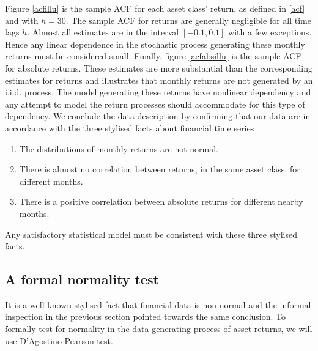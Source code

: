 \documentclass[11pt,a4paper,oneside]{article}
\begin{document}
Figure \ref{acfillu} is the sample ACF for each asset class' return, as defined in \ref{acf} and with $h=30$. The sample ACF for returns are generally negligible for all time lags $h$. Almost all estimates are in the interval $[-0.1 , 0.1]$ with a few exceptions. Hence any linear dependence in the stochastic process generating these monthly returns must be considered small. Finally, figure \ref{acfabsillu} is the sample ACF for absolute returns. These estimates are more substantial than the corresponding estimates for returns and illustrates that monthly returns are not generated by an i.i.d. process. The model generating these returns have nonlinear dependency and any attempt to model the return processes should accommodate for this type of dependency.
We conclude the data description by confirming that our data are in accordance with the three stylised facts about financial time series\cite{Taylor} 
\begin{enumerate}
    \item The distributions of monthly returns are not normal. 
    \item There is almost no correlation between returns, in the same asset class, for different months.
    \item There is a positive correlation between absolute returns for different nearby months.
\end{enumerate}
Any satisfactory statistical model must be consistent with these three stylised facts. 


\subsection{A formal normality test}
\noindent It is a well known stylised fact that financial data is non-normal and the informal inspection in the previous section pointed towards the same conclusion. To formally test for normality in the data generating process of asset returns, we will use D’Agostino-Pearson test.    




\clearpage
\end{document}
